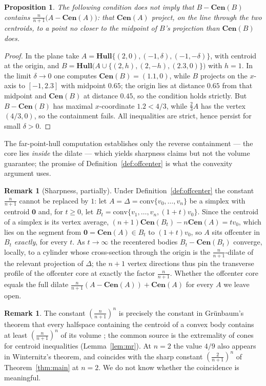 \documentclass[12pt]{article}
\newtheorem{proposition}[theorem]{Proposition}
\theoremstyle{definition}
\newtheorem{remark}[theorem]{Remark}
\newcommand{\Hull}{\mathbf{Hull}}
\newcommand{\Cen}{\mathbf{Cen}}
\begin{document}
\begin{proposition}\label{prop:collinearfails}
The following condition does not imply that $B-\Cen(B)$ contains
$\tfrac{n}{n+1}\bigl(A-\Cen(A)\bigr)$: that $\Cen(A)$ project, on the line
through the two centroids, to a point no closer to the midpoint of $B$'s
projection than $\Cen(B)$ does.
\end{proposition}

\begin{proof}
In the plane take $A=\Hull\{(2,0),(-1,\delta),(-1,-\delta)\}$, with centroid
at the origin, and $B=\Hull\bigl(A\cup\{(2,h),(2,-h),(2.3,0)\}\bigr)$ with
$h=1$.  In the limit $\delta\to 0$ one computes $\Cen(B)=(1.1,0)$, while $B$
projects on the $x$-axis to $[-1,2.3]$ with midpoint $0.65$; the origin lies
at distance $0.65$ from that midpoint and $\Cen(B)$ at distance $0.45$, so
the condition holds strictly.  But $B-\Cen(B)$ has maximal $x$-coordinate
$1.2<4/3$, while $\frac23A$ has the vertex $(4/3,0)$, so the containment
fails.  All inequalities are strict, hence persist for small $\delta>0$.
\end{proof}

\noindent
The far-point-hull computation establishes only the reverse containment ---
the core lies {\em inside} the dilate --- which yields sharpness claims but
not the volume guarantee; the promise of Definition~\ref{def:offcenter} is
what the convexity argument uses.

\begin{remark}[Sharpness, partially]
Under Definition~\ref{def:offcenter} the constant $\frac{n}{n+1}$
cannot be replaced by $1$: let $A=\Delta=\mathrm{conv}\{v_0,\ldots,
v_n\}$ be a simplex with centroid $\mathbf 0$ and, for $t\ge 0$, let
$B_t=\mathrm{conv}\{v_1,\ldots,v_n,(1+t)v_0\}$.  Since the centroid of a
simplex is its vertex average, $(n+1)\Cen(B_t)-n\Cen(A)=tv_0$, which
lies on the segment from $\mathbf 0=\Cen(A)\in B_t$ to $(1+t)v_0$, so
$A$ sits offcenter in $B_t$ {\em exactly}, for every $t$.  As
$t\to\infty$ the recentered bodies $B_t-\Cen(B_t)$ converge, locally,
to a cylinder whose cross-section through the origin is the
$\frac{n}{n+1}$-dilate of the relevant projection of $\Delta$; the
$n+1$ vertex directions thus pin the transverse profile of the
offcenter core at exactly the factor $\frac{n}{n+1}$.  Whether the
offcenter core equals the full dilate
$\frac{n}{n+1}(A-\Cen(A))+\Cen(A)$ for every $A$ we leave open.
\end{remark}

\begin{remark}
The constant $\left(\frac{n}{n+1}\right)^n$ is precisely the constant in
Gr\"unbaum's theorem that every halfspace containing the centroid of a
convex body contains at least $\left(\frac{n}{n+1}\right)^n$ of its
volume \cite{grunbaumhalf}; the common source is the extremality of
cones for centroid inequalities (Lemma~\ref{lem:mr}).  At $n=2$ the
value $4/9$ also appears in Winternitz's theorem, and coincides with the sharp constant
$\left(\frac{2}{n+1}\right)^n$ of Theorem~\ref{thm:main} at $n=2$.  We do
not know whether the coincidence is meaningful.
\end{remark}
\end{document}
